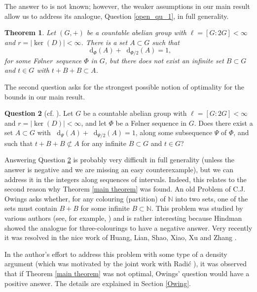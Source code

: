 \documentclass[reqno]{amsart}
\def\N{{\mathbb N}}
\newcommand*\diff{\mathop{}\!\mathrm{d}}
\newtheorem{theorem}{Theorem}[section]
\theoremstyle{definition}
\newtheorem{question}[theorem]{Question}
\theoremstyle{remark}
\theoremstyle{remark}
\def\N{{\mathbb N}}
\newcommand{\Folner}{F\o{}lner}
\begin{document}
The answer to \cite[Question 1.7]{charamaras_kousek_mountakis_radic2025BBingroups} is not known; however, the weaker assumptions in our main result allow us to address its analogue, Question \ref{open_qu_1}, in full generality. 

\begin{theorem}\label{optimality 1 intro}
Let $(G,+)$ be a countable abelian group with 
$\ell=[G:2G]<\infty$ and $r=|\ker(D)|<\infty$. There is a set 
$A\subset G$ such that 
$$\diff_{\Phi}(A)+\diff_{\Phi/2}(A)=1, $$
for some \Folner\ sequence $\Phi$ in $G$, but there does not 
exist an infinite set $B\subset G$ and $t\in G$ with 
$t+B+B\subset A$.    
\end{theorem}

The second question asks for the strongest 
possible notion of optimality for the bounds in our main 
result.

\begin{question}[{cf. {\cite[Question 1.6]{charamaras_kousek_mountakis_radic2025BBingroups}}}] \label{open_qu_0}
Let $G$ be a countable abelian group with $\ell=[G:2G]<\infty$ and 
$r=|\ker(D)|<\infty$, and let $\Phi$ be a \Folner{} sequence in $G$. Does there exist a set $A\subset G$ with 
$\diff_{\Psi}(A)+\diff_{\Psi/2}(A)=1$, along some subsequence $\Psi$ of $\Phi$, and such that $t+B+B \not \subset A$ for any infinite $B\subset G$ and $t\in G$?
\end{question}

Answering Question \ref{open_qu_0} is probably very 
difficult in full generality (unless the answer is negative 
and we are missing an easy 
counterexample), but we can address it in the 
integers along sequences of intervals. Indeed, this relates 
to the second reason why Theorem \ref{main theorem} was 
found. An old Problem of C.J. Owings \cite[Problem E2494]{Owing_problems} asks whether, for any colouring (partition) of $\N$ into 
two sets, 
one of the sets must contain $B+B$ for some infinite 
$B\subset \N$. This problem was studied by various authors 
(see, for example, \cite{Owings1, Owings2}) and is rather interesting because
Hindman \cite{Hindman79_b} showed the analogue for 
three-colourings to have a negative answer. Very recently it 
was resolved in the nice work of Huang, Lian, 
Shao, Xiao, Xu and Zhang \cite{owings_solution}.  

In the 
author's effort to address this problem with some type of a 
density argument (which was motivated by the joint work with 
Radi{\'c} \cite{kousek_radic2025BB}), it was observed that if 
Theorem \ref{main theorem} was not optimal, Owings' 
question would have a positive answer. The details are 
explained in Section \ref{Owing}. 
\end{document}
